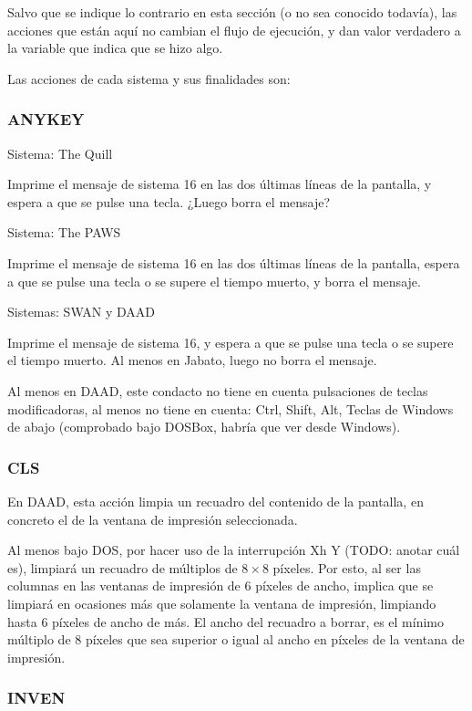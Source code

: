 \documentclass[11pt, a5paper]{article}
\newcommand{\quill}{\textsf{The Quill}\xspace}
\newcommand{\paw}{\textsf{The PAWS}\xspace}
\newcommand{\swan}{\textsf{SWAN}\xspace}
\newcommand{\daad}{\textsf{DAAD}\xspace}
\newcommand{\sistema}[1]{\noindent Sistema: #1 \nopagebreak}
\newcommand{\sistemas}[1]{\noindent Sistemas: #1 \nopagebreak}
\begin{document}
Salvo que se indique lo contrario en esta sección (o no sea conocido todavía), las acciones que están aquí no cambian el flujo de ejecución, y dan valor verdadero a la variable que indica que se hizo algo.

Las acciones de cada sistema y sus finalidades son:

\subsubsection{ANYKEY}

\sistema{\quill}

Imprime el mensaje de sistema 16 en las dos últimas líneas de la pantalla, y espera a que se pulse una tecla. ¿Luego borra el mensaje?

\sistema{\paw}

Imprime el mensaje de sistema 16 en las dos últimas líneas de la pantalla, espera a que se pulse una tecla o se supere el tiempo muerto, y borra el mensaje.

\sistemas{\swan y \daad}

Imprime el mensaje de sistema 16, y espera a que se pulse una tecla o se supere el tiempo muerto. Al menos en Jabato, luego no borra el mensaje.

Al menos en \daad, este condacto no tiene en cuenta pulsaciones de teclas modificadoras, al menos no tiene en cuenta: Ctrl, Shift, Alt, Teclas de Windows de abajo (comprobado bajo DOSBox, habría que ver desde Windows).

\subsubsection{CLS}

En \daad, esta acción limpia un recuadro del contenido de la pantalla, en concreto el de la ventana de impresión seleccionada.

Al menos bajo DOS, por hacer uso de la interrupción Xh Y (TODO: anotar cuál es), limpiará un recuadro de múltiplos de $8 \times 8$ píxeles. Por esto, al ser las columnas en las ventanas de impresión de 6 píxeles de ancho, implica que se limpiará en ocasiones más que solamente la ventana de impresión, limpiando hasta 6 píxeles de ancho de más. El ancho del recuadro a borrar, es el mínimo múltiplo de 8 píxeles que sea superior o igual al ancho en píxeles de la ventana de impresión.

\subsubsection{INVEN}
\end{document}
